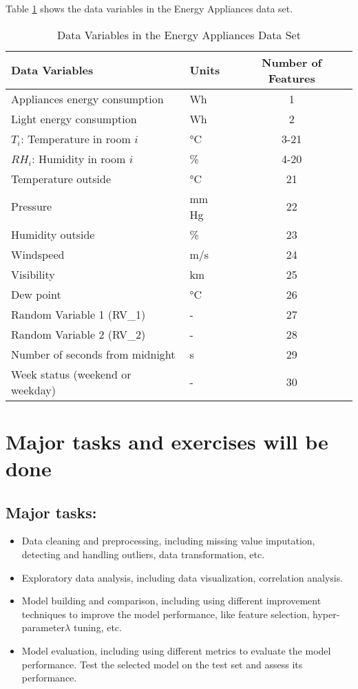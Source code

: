 \documentclass{article}
\begin{document}
Table \ref{tab:energy_appliances} shows the data variables in the Energy Appliances data set.
\begin{table}[!h]
    \centering
    \caption{Data Variables in the Energy Appliances Data Set}
    \begin{tabular}{l l c}
        \toprule
        \textbf{Data Variables} & \textbf{Units} & \textbf{Number of Features} \\
        \midrule
        Appliances energy consumption & Wh & 1 \\
        Light energy consumption & Wh & 2 \\
        $T_i$: Temperature in room $i$ & °C & 3-21 \\
        $RH_i$: Humidity in room $i$ & \% & 4-20 \\
        Temperature outside & °C & 21 \\
        Pressure  & mm Hg & 22 \\
        Humidity outside & \% & 23 \\
        Windspeed & m/s & 24 \\
        Visibility & km & 25 \\
        Dew point & °C & 26 \\
        Random Variable 1 (RV\_1) & - & 27 \\
        Random Variable 2 (RV\_2) & - & 28 \\
        Number of seconds from midnight  & s & 29 \\
        Week status (weekend or weekday) & - & 30 \\
        \bottomrule
    \end{tabular}
    \label{tab:energy_appliances}
\end{table}

\section{Major tasks and exercises will be done}
\subsection{Major tasks:}
\begin{itemize}
    \item Data cleaning and preprocessing, including missing value imputation,
    detecting and handling outliers, data transformation, etc.

    \item Exploratory data analysis, including data visualization, correlation analysis.

    \item Model building and comparison, including using different improvement techniques to
    improve the model performance, like feature selection, hyper-parameter\(\lambda\) tuning, etc.

    \item Model evaluation, including using different metrics to evaluate the model performance.
        Test the selected model on the test set and assess its performance.
\end{itemize}
\end{document}
